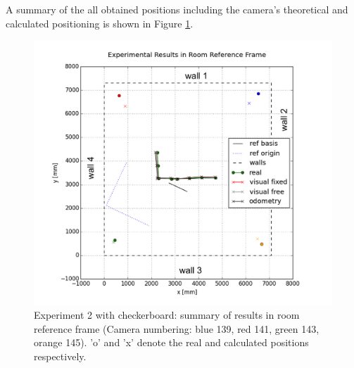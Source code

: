 A summary of the all obtained positions including the camera's theoretical and calculated positioning is shown in Figure \ref{fig:res3_room}.

\begin{figure}
    \centering
    \includegraphics[width=.8\linewidth]{files/res3_all_room2.png}
    \caption{Experiment 2 with checkerboard: summary of results in room reference frame (Camera numbering: blue 139, red 141, green 143, orange 145). 'o' and 'x' denote the real and calculated positions respectively.}
    \label{fig:res3_room}
\end{figure}

